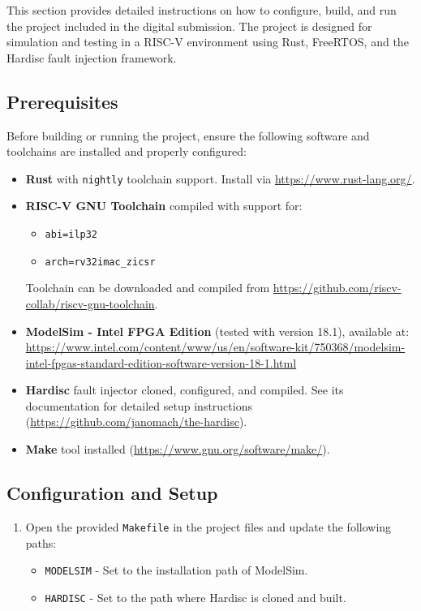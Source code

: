 \documentclass[12pt, letterpaper, slovak]{article}
\begin{document}
\begin{appendices}
This section provides detailed instructions on how to configure, build, and run the project included in the digital submission. The project is designed for simulation and testing in a RISC-V environment using Rust, FreeRTOS, and the Hardisc fault injection framework.

\subsection{Prerequisites}

Before building or running the project, ensure the following software and toolchains are installed and properly configured:

\begin{itemize}
    \item \textbf{Rust} with \texttt{nightly} toolchain support. Install via \url{https://www.rust-lang.org/}.
    \item \textbf{RISC-V GNU Toolchain} compiled with support for:
    \begin{itemize}
        \item \texttt{abi=ilp32}
        \item \texttt{arch=rv32imac\_zicsr}
    \end{itemize}
    Toolchain can be downloaded and compiled from \url{https://github.com/riscv-collab/riscv-gnu-toolchain}.
    \item \textbf{ModelSim - Intel FPGA Edition} (tested with version 18.1), available at:\\
    \url{https://www.intel.com/content/www/us/en/software-kit/750368/modelsim-intel-fpgas-standard-edition-software-version-18-1.html}
    \item \textbf{Hardisc} fault injector cloned, configured, and compiled. See its documentation for detailed setup instructions (\url{https://github.com/janomach/the-hardisc}).
    \item \textbf{Make} tool installed (\url{https://www.gnu.org/software/make/}). 
\end{itemize}

\subsection{Configuration and Setup}

\begin{enumerate}
    \item Open the provided \texttt{Makefile} in the project files and update the following paths:
    \begin{itemize}
        \item \texttt{MODELSIM} - Set to the installation path of ModelSim.
        \item \texttt{HARDISC} - Set to the path where Hardisc is cloned and built.
    \end{itemize}
    

\end{enumerate}
\end{appendices}
\end{document}
